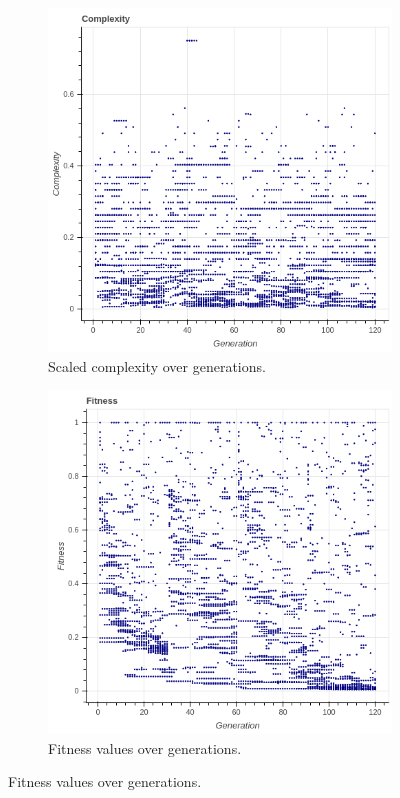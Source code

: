  \begin{figure}
    \centering
    \begin{subfigure}{0.5\textwidth}
    \centering
        \includegraphics[width=0.8\linewidth]{figures/viz_complexity.png}
        \caption{Scaled complexity over generations.}
    \end{subfigure}%
    \begin{subfigure}{0.5\textwidth}
    \centering
        \includegraphics[width=0.8\linewidth]{figures/viz_fitness.png}
        \caption{Fitness values over generations.}
    \end{subfigure}

\end{figure}
